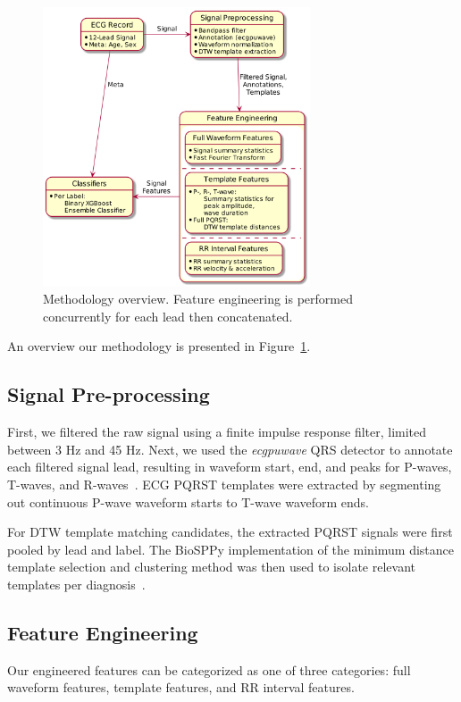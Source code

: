\documentclass[twocolumn]{cinc}
\begin{document}
\begin{figure}[h]
  \centering
  \includegraphics[width=7.9cm]{fig/methodology.png}
  \caption{Methodology overview. Feature engineering is performed concurrently for each lead then concatenated.}
  \label{fig:methodology}
\end{figure}

An overview our methodology is presented in Figure~\ref{fig:methodology}.

\subsection{Signal Pre-processing}

First, we filtered the raw signal using a finite impulse response filter, limited between 3 Hz and 45 Hz.
Next, we used the \emph{ecgpuwave} QRS detector to annotate each filtered signal lead, resulting in waveform start, end, and peaks for P-waves, T-waves, and R-waves~\cite{goldberger_ary_l_physiobank_2000}.
ECG PQRST templates were extracted by segmenting out continuous P-wave waveform starts to T-wave waveform ends.

For DTW template matching candidates, the extracted PQRST signals were first pooled by lead and label.
The BioSPPy implementation of the minimum distance template selection and clustering method was then used to isolate relevant templates per diagnosis~\cite{groupbiosppy_2015, uludag_biometric_2004}.

\subsection{Feature Engineering}

Our engineered features can be categorized as one of three categories: full waveform features, template features, and RR interval features.
\end{document}
